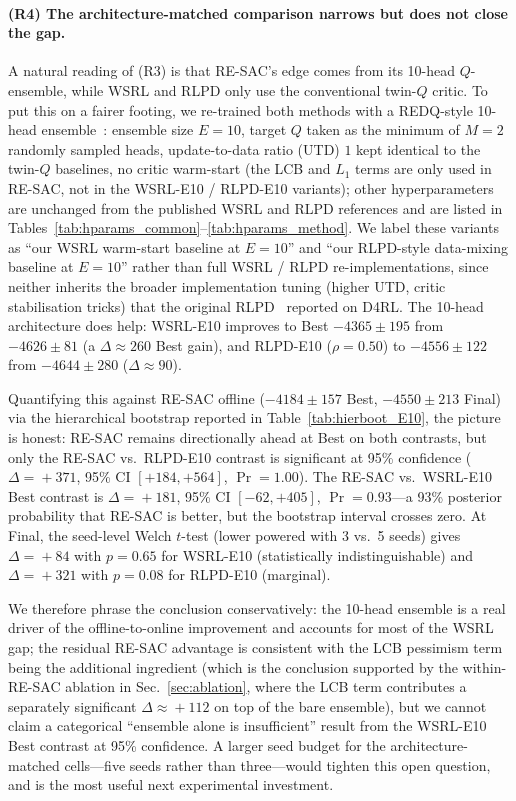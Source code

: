 \documentclass[journal,10pt]{IEEEtran}
\begin{document}
\paragraph{(R4) The architecture-matched comparison narrows but does not close the gap.} A natural reading of (R3) is that RE-SAC's edge comes from its 10-head $Q$-ensemble, while WSRL and RLPD only use the conventional twin-$Q$ critic. To put this on a fairer footing, we re-trained both methods with a REDQ-style 10-head ensemble~\cite{chen2021randomized}: ensemble size $E{=}10$, target $Q$ taken as the minimum of $M{=}2$ randomly sampled heads, update-to-data ratio (UTD) $1$ kept identical to the twin-$Q$ baselines, no critic warm-start (the LCB and $L_1$ terms are only used in RE-SAC, not in the WSRL-E10 / RLPD-E10 variants); other hyperparameters are unchanged from the published WSRL and RLPD references and are listed in Tables~\ref{tab:hparams_common}--\ref{tab:hparams_method}. We label these variants as ``our WSRL warm-start baseline at $E{=}10$'' and ``our RLPD-style data-mixing baseline at $E{=}10$'' rather than full WSRL / RLPD re-implementations, since neither inherits the broader implementation tuning (higher UTD, critic stabilisation tricks) that the original RLPD~\cite{ball2023efficient} reported on D4RL. The 10-head architecture does help: WSRL-E10 improves to Best $-4365 \pm 195$ from $-4626 \pm 81$ (a $\Delta\!\approx\!260$ Best gain), and RLPD-E10 ($\rho{=}0.50$) to $-4556 \pm 122$ from $-4644 \pm 280$ ($\Delta\!\approx\!90$).

Quantifying this against RE-SAC offline ($-4184 \pm 157$ Best, $-4550 \pm 213$ Final) via the hierarchical bootstrap reported in Table~\ref{tab:hierboot_E10}, the picture is honest: RE-SAC remains directionally ahead at Best on both contrasts, but only the RE-SAC vs.\ RLPD-E10 contrast is significant at 95\% confidence ($\Delta\!=\!+371$, 95\% CI $[+184, +564]$, $\Pr\!=\!1.00$). The RE-SAC vs.\ WSRL-E10 Best contrast is $\Delta\!=\!+181$, 95\% CI $[-62, +405]$, $\Pr\!=\!0.93$---a 93\% posterior probability that RE-SAC is better, but the bootstrap interval crosses zero. At Final, the seed-level Welch $t$-test (lower powered with 3 vs.\ 5 seeds) gives $\Delta\!=\!+84$ with $p\!=\!0.65$ for WSRL-E10 (statistically indistinguishable) and $\Delta\!=\!+321$ with $p\!=\!0.08$ for RLPD-E10 (marginal).

We therefore phrase the conclusion conservatively: the 10-head ensemble is a real driver of the offline-to-online improvement and accounts for most of the WSRL gap; the residual RE-SAC advantage is consistent with the LCB pessimism term being the additional ingredient (which is the conclusion supported by the within-RE-SAC ablation in Sec.~\ref{sec:ablation}, where the LCB term contributes a separately significant $\Delta\!\approx\!+112$ on top of the bare ensemble), but we cannot claim a categorical ``ensemble alone is insufficient'' result from the WSRL-E10 Best contrast at 95\% confidence. A larger seed budget for the architecture-matched cells---five seeds rather than three---would tighten this open question, and is the most useful next experimental investment.
\end{document}
